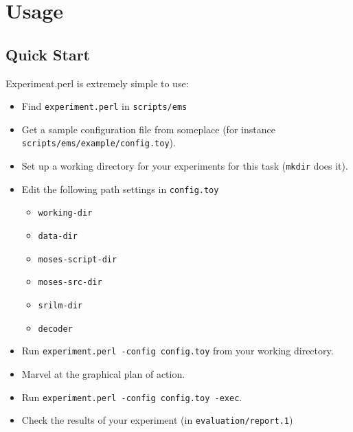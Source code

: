 \documentclass{pbml}
\begin{document}
\section{Usage}

\subsection{Quick Start}

Experiment.perl is extremely simple to use:

\begin{itemize}
\item Find {\tt experiment.perl} in {\tt scripts/ems}

\item Get a sample configuration file from someplace (for instance {\tt scripts/ems/exam\-ple/config.toy}).

\item Set up a working directory for your experiments for this task ({\tt mkdir} does it).

\item Edit the following path settings in {\tt config.toy}
\begin{itemize}
\item {\tt working-dir}

\item {\tt data-dir}

\item {\tt moses-script-dir}

\item {\tt moses-src-dir}

\item {\tt srilm-dir}

\item {\tt decoder}

\end{itemize}

\item Run {\tt experiment.perl -config config.toy} from your working directory.

\item Marvel at the graphical plan of action.

\item Run {\tt experiment.perl -config config.toy -exec}.

\item Check the results of your experiment (in {\tt evaluation/report.1})

\end{itemize}
\end{document}

